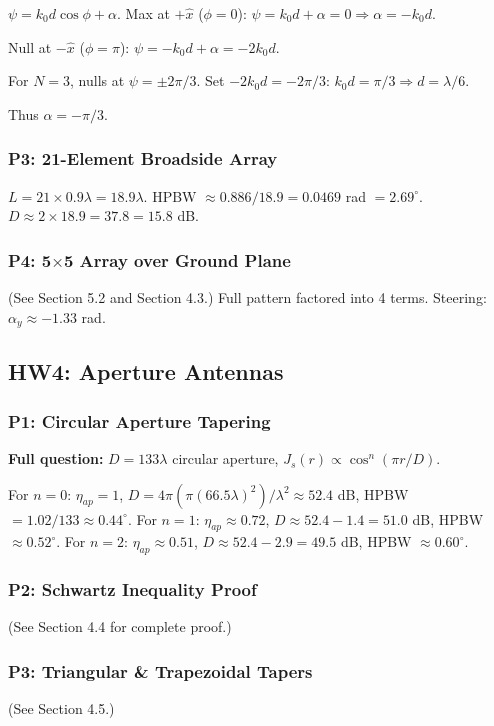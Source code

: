 \documentclass[10pt,letterpaper]{article}
\newcommand{\xhat}{\hat{x}}
\newcommand{\degrees}{^{\circ}}
\begin{document}
$\psi = k_0 d\cos\phi+\alpha$. Max at $+\xhat$ ($\phi=0$): $\psi=k_0 d+\alpha=0 \Rightarrow \alpha=-k_0 d$.

Null at $-\xhat$ ($\phi=\pi$): $\psi=-k_0 d+\alpha=-2k_0 d$.

For $N=3$, nulls at $\psi=\pm2\pi/3$. Set $-2k_0 d = -2\pi/3$: $k_0 d = \pi/3 \Rightarrow d = \lambda/6$.

Thus $\alpha = -\pi/3$.

\subsubsection{P3: 21-Element Broadside Array}
$L = 21\times0.9\lambda = 18.9\lambda$. HPBW $\approx0.886/18.9 = 0.0469$ rad $= 2.69\degrees$. $D\approx2\times18.9 = 37.8 = 15.8$ dB.

\subsubsection{P4: 5$\times$5 Array over Ground Plane}
(See Section 5.2 and Section 4.3.) Full pattern factored into 4 terms. Steering: $\alpha_y \approx -1.33$ rad.

\subsection{HW4: Aperture Antennas}

\subsubsection{P1: Circular Aperture Tapering}
\textbf{Full question:} $D=133\lambda$ circular aperture, $J_s(r)\propto\cos^n(\pi r/D)$.

For $n=0$: $\eta_{ap}=1$, $D = 4\pi(\pi(66.5\lambda)^2)/\lambda^2 \approx 52.4$ dB, HPBW $=1.02/133\approx0.44\degrees$.
For $n=1$: $\eta_{ap}\approx0.72$, $D\approx52.4-1.4 = 51.0$ dB, HPBW $\approx0.52\degrees$.
For $n=2$: $\eta_{ap}\approx0.51$, $D\approx52.4-2.9 = 49.5$ dB, HPBW $\approx0.60\degrees$.

\subsubsection{P2: Schwartz Inequality Proof}
(See Section 4.4 for complete proof.)

\subsubsection{P3: Triangular \& Trapezoidal Tapers}
(See Section 4.5.)
\end{document}
